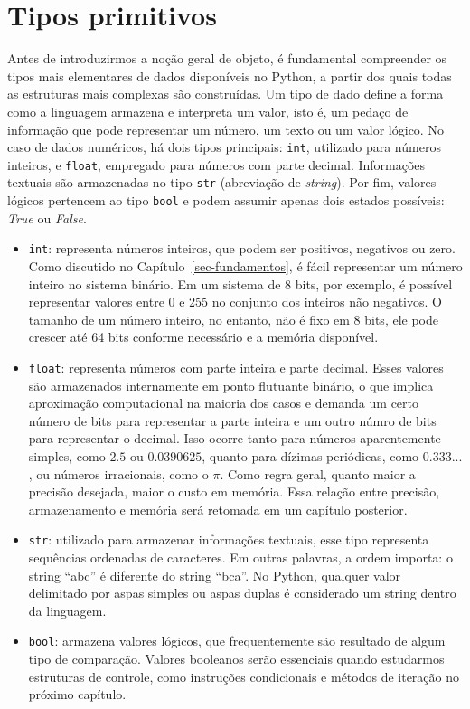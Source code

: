\documentclass[
  brazilian,
  letterpaper,
  DIV=11,
  numbers=noendperiod]{scrreprt}
\begin{document}
\section{Tipos primitivos}\label{tipos-primitivos}

Antes de introduzirmos a noção geral de objeto, é fundamental
compreender os tipos mais elementares de dados disponíveis no Python, a
partir dos quais todas as estruturas mais complexas são construídas. Um
tipo de dado define a forma como a linguagem armazena e interpreta um
valor, isto é, um pedaço de informação que pode representar um número,
um texto ou um valor lógico. No caso de dados numéricos, há dois tipos
principais: \texttt{int}, utilizado para números inteiros, e
\texttt{float}, empregado para números com parte decimal. Informações
textuais são armazenadas no tipo \texttt{str} (abreviação de
\emph{string}). Por fim, valores lógicos pertencem ao tipo \texttt{bool}
e podem assumir apenas dois estados possíveis: \emph{True} ou
\emph{False}.

\begin{itemize}
\item
  \texttt{int}: representa números inteiros, que podem ser positivos,
  negativos ou zero. Como discutido no Capítulo~\ref{sec-fundamentos}, é
  fácil representar um número inteiro no sistema binário. Em um sistema
  de 8 bits, por exemplo, é possível representar valores entre 0 e 255
  no conjunto dos inteiros não negativos. O tamanho de um número
  inteiro, no entanto, não é fixo em 8 bits, ele pode crescer até 64
  bits conforme necessário e a memória disponível.
\item
  \texttt{float}: representa números com parte inteira e parte decimal.
  Esses valores são armazenados internamente em ponto flutuante binário,
  o que implica aproximação computacional na maioria dos casos e demanda
  um certo número de bits para representar a parte inteira e um outro
  númro de bits para representar o decimal. Isso ocorre tanto para
  números aparentemente simples, como \(2.5\) ou \(0.0390625\), quanto
  para dízimas periódicas, como \(0.333...\), ou números irracionais,
  como o \(\pi\). Como regra geral, quanto maior a precisão desejada,
  maior o custo em memória. Essa relação entre precisão, armazenamento e
  memória será retomada em um capítulo posterior.
\item
  \texttt{str}: utilizado para armazenar informações textuais, esse tipo
  representa sequências ordenadas de caracteres. Em outras palavras, a
  ordem importa: o string ``abc'' é diferente do string ``bca''. No
  Python, qualquer valor delimitado por aspas simples ou aspas duplas é
  considerado um string dentro da linguagem.
\item
  \texttt{bool}: armazena valores lógicos, que frequentemente são
  resultado de algum tipo de comparação. Valores booleanos serão
  essenciais quando estudarmos estruturas de controle, como instruções
  condicionais e métodos de iteração no próximo capítulo.
\end{itemize}
\end{document}
